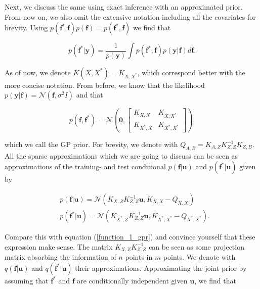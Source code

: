 \documentclass[12pt,a4paper,oneside]{book}
\begin{document}
Next, we discuss the same using exact inference with an approximated prior. From now on, we also omit the extensive notation including all the covariates for brevity. Using $p(\bm{f}^{\ast} | \bm{f}) p(\bm{f})  = p(\bm{f}^{\ast} , \bm{f})$ we find that 

\begin{equation}
p(\bm{f}^{\ast}|\bm{y})=  \dfrac{1}{ p(\bm{y})}\int  p(\bm{f}^{\ast} , \bm{f}) p(\bm{y} | \bm{f})  d\bm{f}.
\end{equation}
 
As of now, we denote $K(X,X^{\ast}) = K_{X,X^{\ast}}$, which correspond better with the more concise notation. From before, we know that the likelihood $p(\bm{y}|\bm{f}) =  \mathcal{N} (\bm{f}, \sigma^2 I)$ and that 

\begin{equation}
p(\bm{f},\bm{f}^{\ast}) = 
\mathcal{N} \left( \bm{0}, 
\begin{bmatrix}
    K_{X,X} & K_{X,X^{\ast}}\\
    K_{X^{\ast},X}  & K_{X^{\ast},X^{\ast}}
\end{bmatrix} 
\right).
\end{equation}

which we call the GP prior. For brevity, we denote with $Q_{A,B} = K_{A,Z} K_{Z,Z}^{-1} K_{Z,B}$. All the sparse approximations which we are going to discuss can be seen as approximations of the training- and test conditional $p(\bm{f}|\bm{u})$ and $p(\bm{f}^{\ast}|\bm{u})$ given by 

\begin{equation}\label{sparse1}
\begin{aligned}
&p(\bm{f}|\bm{u}) = \mathcal{N}(K_{X,Z} K^{-1}_{Z,Z} \bm{u}, K_{X,X} - Q_{X,X}) \\
&p(\bm{f}^{\ast}|\bm{u}) = \mathcal{N}(K_{X^{\ast},Z} K^{-1}_{Z,Z} \bm{u}, K_{X^{\ast},X^{\ast}} - Q_{X^{\ast},X^{\ast}}). 
\end{aligned}
\end{equation}

Compare this with equation (\ref{function_1_gpr}) and convince yourself that these expression make sense. The matrix $K_{X,Z} K^{-1}_{Z,Z}$ can be seen as some projection matrix absorbing the information of $n$ points in $m$ points. We denote with $q(\bm{f}|\bm{u})$ and $q(\bm{f}^{\ast}|\bm{u})$ their approximations. Approximating the joint prior by assuming that $\bm{f}^{\ast}$ and $\bm{f}$ are conditionally independent given $\bm{u}$, we find that 
\end{document}
